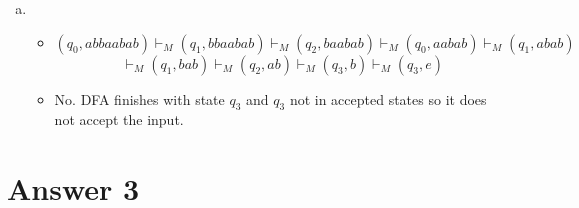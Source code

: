 \documentclass[12pt]{article}
\begin{document}
\begin{enumerate}[a)]
    \item \begin{itemize}
        \item  $$(q_0, abbaabab) \vdash_M (q_1, bbaabab) \vdash_M (q_2, baabab) \vdash_M (q_0, aabab) \vdash_M  (q_1, abab) $$
$$\vdash_M (q_1, bab) \vdash_M (q_2, ab) \vdash_M (q_3, b) \vdash_M (q_3, e)$$

        \item No. DFA finishes with state $q_3$ and $q_3$ not in accepted states so it does not accept the input.
    \end{itemize}
    
    
    
\end{enumerate}


\section*{Answer 3}
\end{document}
